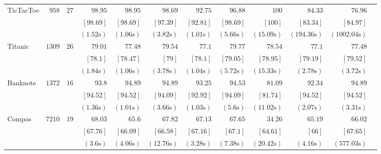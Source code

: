\begin{table*}[h]
\begin{center}
\begin{tabular}{l  r  r r r r r r r rrr}
			{ TicTacToe}   & $  958 $  & $  27 $  & $   98.95  $    & $   98.95  $    & $   98.69  $    & $   92.75  $    & $   96.88  $    & $   100 $    & $   84.33  $    & $   76.96  $   \\ & & 
			& $  [ 98.69 ] $    & $  [ 98.69 ] $    & $  [ 97.39 ] $    & $  [ 92.81 ] $    & $  [ 98.69 ] $    & $  [ 100] $    & $  [ 83.34 ] $    & $  [ 84.97 ] $   \\ & & 
			& $  ( 1.52 \text{s} ) $    & $  ( 1.06 \text{s} ) $    & $  ( 3.82 \text{s} ) $    & $  ( 1.01 \text{s} ) $    & $  ( 5.66 \text{s} ) $    & $  ( 15.09 \text{s} ) $    & $  ( 194.36 \text{s} ) $    & $  ( 1002.04 \text{s} ) $   \\[.1cm] 
			{ Titanic}   & $  1309 $  & $  26 $  & $   79.01  $    & $   77.48  $    & $   79.54  $    & $   77.1  $    & $   79.77  $    & $   78.54  $    & $   77.1  $    & $   77.48  $   \\ & & 
			& $  [ 78.1 ] $    & $  [ 78.47 ] $    & $  [ 79] $    & $  [ 78.1 ] $    & $  [ 79.05 ] $    & $  [ 78.95 ] $    & $  [ 79.19 ] $    & $  [ 79.52 ] $   \\ & & 
			& $  ( 1.84 \text{s} ) $    & $  ( 1.06 \text{s} ) $    & $  ( 3.78 \text{s} ) $    & $  ( 1.04 \text{s} ) $    & $  ( 5.72 \text{s} ) $    & $  ( 15.33 \text{s} ) $    & $  ( 2.78 \text{s} ) $    & $  ( 3.72 \text{s} ) $   \\[.1cm] 
			{ Banknote}   & $  1372 $  & $  16 $  & $   93.8  $    & $   94.89  $    & $   94.89  $    & $   93.25  $    & $   94.53  $    & $   81.09  $    & $   92.34  $    & $   94.89  $   \\ & & 
			& $  [ 94.52 ] $    & $  [ 94.52 ] $    & $  [ 94.09 ] $    & $  [ 92.92 ] $    & $  [ 94.09 ] $    & $  [ 81.74 ] $    & $  [ 94.52 ] $    & $  [ 94.52 ] $   \\ & & 
			& $  ( 1.36 \text{s} ) $    & $  ( 1.01 \text{s} ) $    & $  ( 3.66 \text{s} ) $    & $  ( 1.03 \text{s} ) $    & $  ( 5.6 \text{s} ) $    & $  ( 11.02 \text{s} ) $    & $  ( 2.07 \text{s} ) $    & $  ( 3.31 \text{s} ) $   \\[.1cm] 
			{ Compas}   & $  7210 $  & $  19 $  & $   68.03  $    & $   65.6  $    & $   67.82  $    & $   67.13  $    & $   67.65  $    & $   34.26  $    & $   65.19  $    & $   66.02  $   \\ & & 
			& $  [ 67.76 ] $    & $  [ 66.09 ] $    & $  [ 66.58 ] $    & $  [ 67.16 ] $    & $  [ 67.1 ] $    & $  [ 64.61 ] $    & $  [ 66] $    & $  [ 67.65 ] $   \\ & & 
			& $  ( 3.6 \text{s} ) $    & $  ( 4.06 \text{s} ) $    & $  ( 12.76 \text{s} ) $    & $  ( 3.28 \text{s} ) $    & $  ( 7.38 \text{s} ) $    & $  ( 20.42 \text{s} ) $    & $  ( 4.16 \text{s} ) $    & $  ( 577.03 \text{s} ) $   \\[.1cm] 

\end{tabular}
\end{center}
\end{table*}
